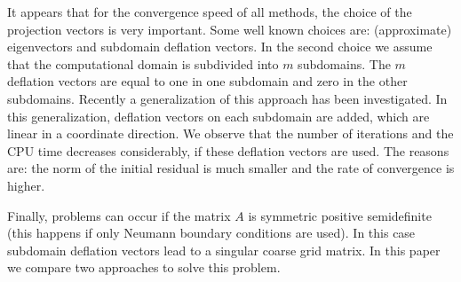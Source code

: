 \documentclass{report}
\begin{document}
It appears that for the convergence speed of
all methods, the choice of the projection vectors is very
important. Some well known choices are: (approximate) eigenvectors and
subdomain deflation vectors. In the second choice we assume that the
computational domain is subdivided into $m$ subdomains. The $m$ deflation vectors are
equal to one in one subdomain and zero in the other subdomains. Recently
a generalization of this approach has been investigated. In this
generalization, deflation vectors on each subdomain are added,
which are linear in a coordinate direction. We
observe that the number of iterations and the CPU time decreases considerably,
if these deflation vectors are used.
The reasons are: the norm of the initial residual is much smaller
and the rate of convergence is higher.

Finally, problems can occur if the matrix $A$ is symmetric positive semidefinite (this
happens if only Neumann boundary conditions are used).
In this case subdomain deflation vectors lead to a singular coarse grid matrix.
In this paper we compare two approaches to solve this problem.
\end{document}
